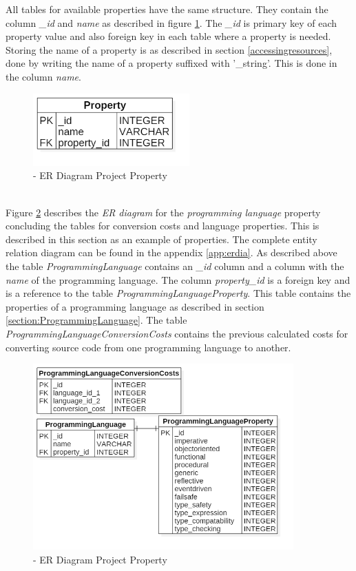 All tables for available properties have the same structure. They contain the column \textit{\_id} and \textit{name} as described in figure \ref{fig:erproperty}. The \textit{\_id} is primary key of each property value and also foreign key in each table where a property is needed. Storing the name of a property is as described in section \ref{accessingresources}, done by writing the name of a property suffixed with '\_string'. This is done in the column \textit{name}.\\
\begin{figure}[h] 
	\centering 
	\includegraphics[width=6cm]{images/ERProperty.png} 
	\caption{- ER Diagram Project Property} 
	\label{fig:erproperty}
\end{figure}\\
Figure \ref{fig:plproperty} describes the \textit{ER diagram} for the \textit{programming language} property concluding the tables for conversion costs and language properties. This is described in this section as an example of properties. The complete entity relation diagram can be found in the appendix \ref{app:erdia}. As described above the table \textit{ProgrammingLanguage} contains an \textit{\_id} column and a column with the \textit{name} of the programming language. The column \textit{property\_id} is a foreign key and is a reference to the table \textit{ProgrammingLanguageProperty}. This table contains the properties of a programming language as described in section \ref{section:ProgrammingLanguage}. The table \textit{ProgrammingLanguageConversionCosts} contains the previous calculated costs for converting source code from one programming language to another.  
\begin{figure}[h] 
	\centering 
	\includegraphics[width=10cm]{images/PLProperty.png} 
	\caption{- ER Diagram Project Property} 
	\label{fig:plproperty}
\end{figure}\\

